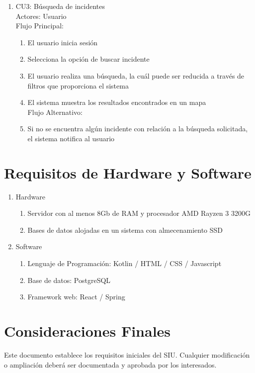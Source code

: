 \documentclass{article}
\begin{document}
\begin{enumerate}
\begin{enumerate}
        \item  CU3: Búsqueda de incidentes\\
        Actores: Usuario\\
        Flujo Principal:
            \begin{enumerate}
                \item El usuario inicia sesión
                \item Selecciona la opción de buscar incidente
                \item El usuario realiza una búsqueda, la cuál puede ser reducida a través de filtros que proporciona el sistema
                \item El sistema muestra los resultados encontrados en un mapa\\
                Flujo Alternativo:
                \item Si no se encuentra algún incidente con relación a la búsqueda solicitada, el sistema notifica al usuario
            \end{enumerate}
            
    \end{enumerate}

\section {Requisitos de Hardware y Software}
    \begin{enumerate}
        \item Hardware
            \begin{enumerate}
                \item Servidor con al menos 8Gb de RAM y procesador AMD Rayzen 3 3200G
                \item Bases de datos alojadas en un sistema con almecenamiento SSD 
            \end{enumerate}

        \item Software
            \begin{enumerate}
                \item Lenguaje de Programación: Kotlin / HTML / CSS / Javascript
                \item Base de datos: PostgreSQL
                \item Framework web: React / Spring 
            \end{enumerate}
    \end{enumerate}

\section{Consideraciones Finales}
Este documento establece los requisitos iniciales del SIU. Cualquier modificación o ampliación deberá ser documentada y aprobada por los interesados.

\end{enumerate}
\end{document}

